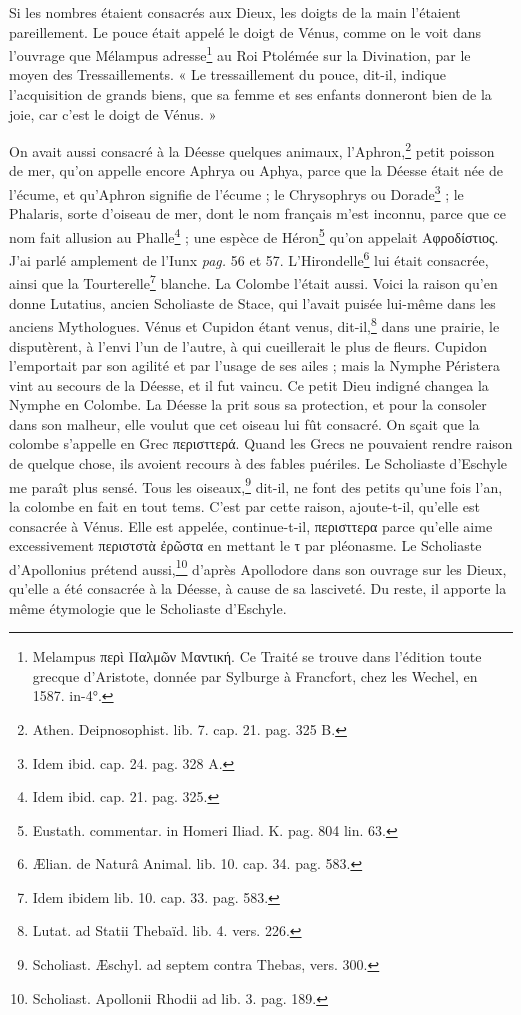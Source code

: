 \documentclass[a4paper, 11pt, oneside, polutonikogreek, french]{article}
\begin{document}
Si les nombres étaient consacrés aux Dieux, les doigts de la main l'étaient pareillement. Le pouce était appelé le doigt de Vénus, comme on le voit dans l'ouvrage que Mélampus adresse\footnote{Melampus περὶ Παλμῶν Μαντική. Ce Traité se trouve dans l'édition toute grecque d'Aristote, donnée par Sylburge à Francfort, chez les Wechel, en 1587. in-4°.} au Roi Ptolémée sur la Divination, par le moyen des Tressaillements. « Le tressaillement du pouce, dit-il, indique l'acquisition de grands biens, que sa femme et ses enfants donneront bien de la joie, car c'est le doigt de Vénus. »

On avait aussi consacré à la Déesse quelques animaux, l'Aphron,\footnote{Athen. Deipnosophist. lib. 7. cap. 21. pag. 325 B.} petit poisson de mer, qu'on appelle encore Aphrya ou Aphya, parce que la Déesse était née de l'écume, et qu'Aphron signifie de l'écume ; le Chrysophrys ou Dorade\footnote{Idem ibid. cap. 24. pag. 328 A.} ; le Phalaris, sorte d'oiseau de mer, dont le nom français m'est inconnu, parce que ce nom fait allusion au Phalle\footnote{Idem ibid. cap. 21. pag. 325.} ; une espèce de Héron\footnote{Eustath. commentar. in Homeri Iliad. K. pag. 804 lin. 63.} qu'on appelait Αφροδίστιος. J'ai parlé amplement de l'Iunx \emph{pag.} 56 et 57. L'Hirondelle\footnote{Ælian. de Naturâ Animal. lib. 10. cap. 34. pag. 583.} lui était consacrée, ainsi que la Tourterelle\footnote{Idem ibidem lib. 10. cap. 33. pag. 583.} blanche. La Colombe l'était aussi. Voici la raison qu'en donne Lutatius, ancien Scholiaste de Stace, qui l'avait puisée lui-même dans les anciens Mythologues. Vénus et Cupidon étant venus, dit-il,\footnote{Lutat. ad Statii Thebaïd. lib. 4. vers. 226.} dans une prairie, le disputèrent, à l'envi l'un de l'autre, à qui cueillerait le plus de fleurs. Cupidon l'emportait par son agilité et par l'usage de ses ailes ; mais la Nymphe Péristera vint au secours de la Déesse, et il fut vaincu. Ce petit Dieu indigné changea la Nymphe en Colombe. La Déesse la prit sous sa protection, et pour la consoler dans son malheur, elle voulut que cet oiseau lui fût consacré. On sçait que la colombe s'appelle en Grec περισττερά. Quand les Grecs ne pouvaient rendre raison de quelque chose, ils avoient recours à des fables puériles. Le Scholiaste d'Eschyle me paraît plus sensé. Tous les oiseaux,\footnote{Scholiast. Æschyl. ad septem contra Thebas, vers. 300.} dit-il, ne font des petits qu'une fois l'an, la colombe en fait en tout tems. C'est par cette raison, ajoute-t-il, qu'elle est consacrée à Vénus. Elle est appelée, continue-t-il, περισττερα parce qu'elle aime excessivement περιστστὰ ἐρῶστα en mettant le τ par pléonasme. Le Scholiaste d'Apollonius prétend aussi,\footnote{Scholiast. Apollonii Rhodii ad lib. 3. pag. 189.} d'après Apollodore dans son ouvrage sur les Dieux, qu'elle a été consacrée à la Déesse, à cause de sa lasciveté. Du reste, il apporte la même étymologie que le Scholiaste d'Eschyle.
\end{document}
